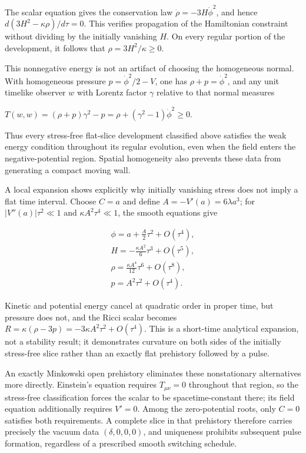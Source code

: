 \documentclass[11pt]{article}
\begin{document}
The scalar equation gives the conservation law $\dot\rho=-3H\dot\phi^2$, and hence $d(3H^2-\kappa\rho)/d\tau=0$. This verifies propagation of the Hamiltonian constraint without dividing by the initially vanishing $H$. On every regular portion of the development, it follows that $\rho=3H^2/\kappa\geq0$.

This nonnegative energy is not an artifact of choosing the homogeneous normal. With homogeneous pressure $p=\dot\phi^2/2-V$, one has $\rho+p=\dot\phi^2$, and any unit timelike observer $w$ with Lorentz factor $\gamma$ relative to that normal measures

$T(w,w)=(\rho+p)\gamma^2-p=\rho+(\gamma^2-1)\dot\phi^2\geq0.$

Thus every stress-free flat-slice development classified above satisfies the weak energy condition throughout its regular evolution, even when the field enters the negative-potential region. Spatial homogeneity also prevents these data from generating a compact moving wall.

A local expansion shows explicitly why initially vanishing stress does not imply a flat time interval. Choose $C=a$ and define $A=-V'(a)=6\lambda a^3$; for $|V''(a)|\tau^2\ll1$ and $\kappa A^2\tau^4\ll1$, the smooth equations give

\[\begin{gathered}\phi=a+\frac{A}{2}\tau^2+O(\tau^4), \\ H=-\frac{\kappa A^2}{6}\tau^3+O(\tau^5), \\ \rho=\frac{\kappa A^4}{12}\tau^6+O(\tau^8), \\ p=A^2\tau^2+O(\tau^4).\end{gathered}\]

Kinetic and potential energy cancel at quadratic order in proper time, but pressure does not, and the Ricci scalar becomes $R=\kappa(\rho-3p)=-3\kappa A^2\tau^2+O(\tau^4)$. This is a short-time analytical expansion, not a stability result; it demonstrates curvature on both sides of the initially stress-free slice rather than an exactly flat prehistory followed by a pulse.

An exactly Minkowski open prehistory eliminates these nonstationary alternatives more directly. Einstein's equation requires $T_{\mu\nu}=0$ throughout that region, so the stress-free classification forces the scalar to be spacetime-constant there; its field equation additionally requires $V'=0$. Among the zero-potential roots, only $C=0$ satisfies both requirements. A complete slice in that prehistory therefore carries precisely the vacuum data $(\delta,0,0,0)$, and uniqueness prohibits subsequent pulse formation, regardless of a prescribed smooth switching schedule.
\end{document}
